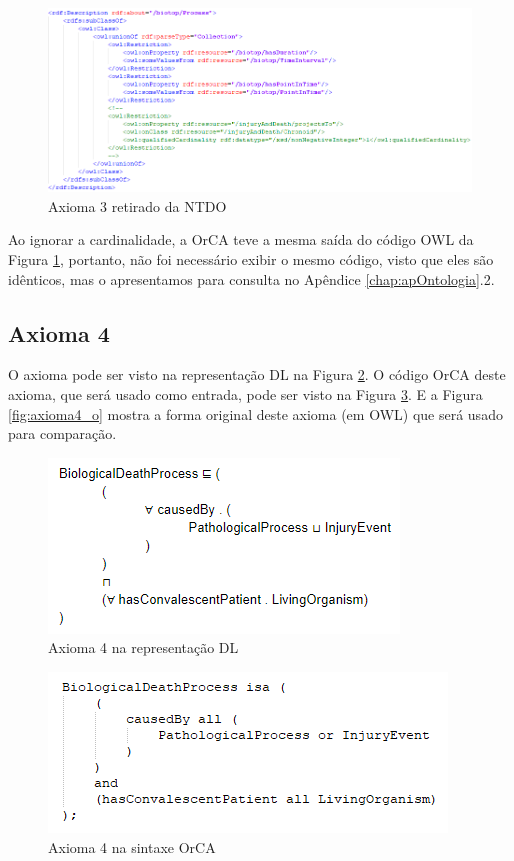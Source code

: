 \documentclass{bcc}
\begin{document}
\begin{figure}[H]
\centering
\includegraphics[width=.9\textwidth]{Figuras/axioma3_o.png}
\caption{Axioma 3 retirado da NTDO} 
\label{fig:axioma3_o}
\end{figure}

Ao ignorar a cardinalidade, a OrCA teve a mesma saída do código OWL da Figura \ref{fig:axioma3_o}, portanto, não foi necessário exibir o mesmo código, visto que eles são idênticos, mas o apresentamos para consulta no Apêndice \ref{chap:apOntologia}.2.

\subsection{Axioma 4}
O axioma pode ser visto na representação DL na Figura \ref{fig:axioma4_dl}. O código OrCA deste axioma, que será usado como entrada, pode ser visto na Figura \ref{fig:axioma4_orca}. E a Figura \ref{fig:axioma4_o} mostra a forma original deste axioma (em OWL) que será usado para comparação. 

\begin{figure}[H]
\centering
\includegraphics[width=.6\textwidth]{Figuras/axioma4_dl.png}
\caption{Axioma 4 na representação DL} 
\label{fig:axioma4_dl}
\end{figure}

\begin{figure}[H]
\centering
\includegraphics[width=.7\textwidth]{Figuras/axioma4_orca.png}
\caption{Axioma 4 na sintaxe OrCA} 
\label{fig:axioma4_orca}
\end{figure}
\end{document}
